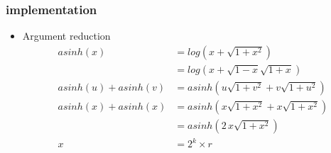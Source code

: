 \documentclass[10pt,a4paper,final,oneside]{article}
\numberwithin{equation}{subsection}
\begin{document}
\subsubsection{implementation}
\begin{itemize}
\item Argument reduction
    \[
        \begin{aligned}
          asinh(x) &= log(x+\sqrt{1+x^2}) \\
                   &= log(x+\sqrt{1-x}\sqrt{1+x}) \\
          asinh(u) + asinh(v) &= asinh(u\sqrt{1+v^2} + v\sqrt{1+u^2}) \\
          asinh(x) + asinh(x) &= asinh(x\sqrt{1+x^2} + x\sqrt{1+x^2}) \\
                              &= asinh(2\,x\sqrt{1+x^2}) \\
          x &= 2^k\times r
        \end{aligned}
    \]
\end{itemize}



\end{document}

